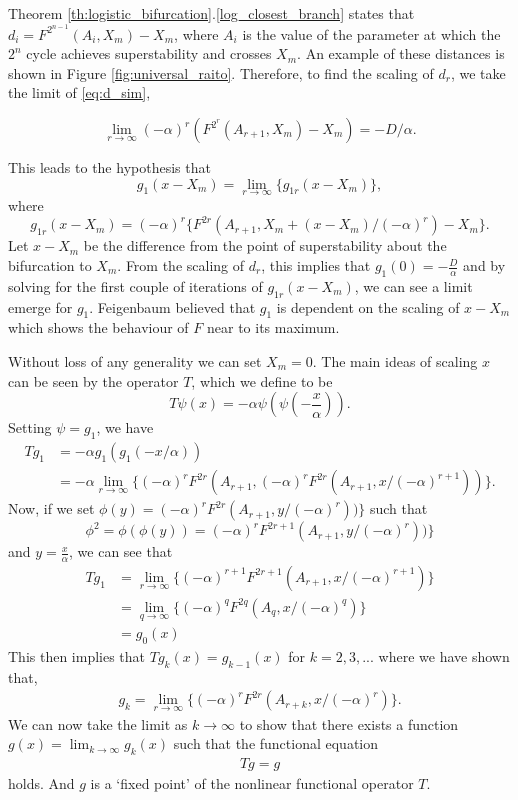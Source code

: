 Theorem \ref{th:logistic_bifurcation}.\ref{log_closest_branch} states that $d_i = F^{2^{n-1}}(A_i, X_m) - X_m$, where $A_i$ is the value of the parameter at which the $2^n$ cycle achieves superstability and crosses $X_m$. An example of these distances is shown in Figure \ref{fig:universal_raito}.
Therefore, to find the scaling of $d_r$, we take the limit of \eqref{eq:d_sim},

\begin{equation}
\lim_{r \to \infty} (-\alpha)^r \left(F^{2^r}(A_{r+1}, X_m) - X_m\right) = - D/\alpha.
\end{equation}

This leads to the hypothesis that
$$
g_1(x-X_m)=\lim_{r \to \infty} \{g_{1r}(x-X_m)\},
$$
where
$$
g_{1r}(x-X_m) = (-\alpha)^r \{F^{2r}(A_{r+1}, X_m + (x-X_m)/(-\alpha)^r)-X_m\}.
$$
Let $x-X_m$ be the difference from the point of superstability about the bifurcation to $X_m$. 
From the scaling of $d_r$, this implies that $g_1(0)=-\frac{D}{\alpha}$ and by solving for the first couple of iterations of $g_{1r}(x-X_m)$, we can see a limit emerge for $g_1$.
Feigenbaum believed that $g_1$ is dependent on the scaling of $x-X_m$ which shows the behaviour of $F$ near to its maximum. 

Without loss of any generality we can set $X_m=0$.
The main ideas of scaling $x$ can be seen by the operator $T$, which we define to be
\begin{equation} \label{eq: operator T}
T\psi(x)=-\alpha \psi (\psi(-\frac{x}{\alpha})).
\end{equation}
Setting $\psi=g_1$, we have
\begin{align}
    Tg_1 &=-\alpha g_1(g_1(-x/\alpha)) \nonumber \\
    &= -\alpha \lim_{r \to \infty} \{(-\alpha)^rF^{2r}(A_{r+1}, (-\alpha)^rF^{2r}(A_{r+1},x/(-\alpha)^{r+1}))\}.  \label{eq:one}
\end{align}
Now, if we set $\phi(y)=(-\alpha)^rF^{2r}(A_{r+1},y/(-\alpha)^r))\}$ such that $$\phi^2=\phi(\phi(y))=(-\alpha)^rF^{2r+1}(A_{r+1},y/(-\alpha)^r))\}$$ and $y=\frac{x}{\alpha}$, we can see that
\begin{align*}
    Tg_1 &= \lim_{r \to \infty} \{(-\alpha)^{r+1}F^{2r+1}(A_{r+1}, x/(-\alpha)^{r+1})\} \\
    &= \lim_{q \to \infty} \{(-\alpha)^qF^{2q}(A_q,x/(-\alpha)^q)\} \\
    &= g_0(x)
\end{align*}
This then implies that $Tg_k(x)=g_{k-1}(x)$ for $k = 2,3,...$ where we have shown that,
\begin{align}
    g_k=\lim_{r \to \infty} \{(-\alpha)^{r}F^{2r}(A_{r+k}, x/(-\alpha)^{r})\}. \label{eq:two}
\end{align} 
We can now take the limit as $k \to \infty$ to show that there exists a function $g(x)= \lim_{k \to \infty}g_k(x)$ such that  the functional equation
\begin{align}
    Tg=g \label{eq:FunctionalOperator}
\end{align}
holds. 
And $g$ is a  `fixed point' of the nonlinear functional operator $T$.


